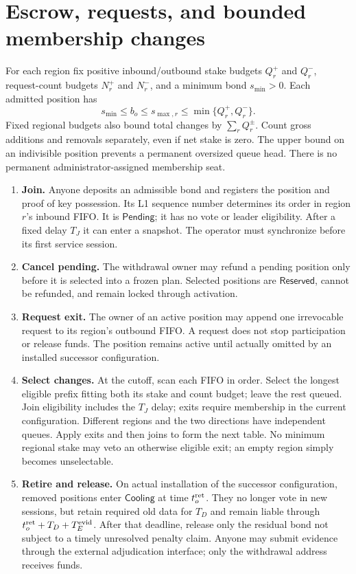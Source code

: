\documentclass[11pt,a4paper]{article}
\newcommand{\Tag}[1]{\ensuremath{\mathsf{#1}}}
\begin{document}
\section{Escrow, requests, and bounded membership changes}
\label{sec:stake}

For each region fix positive inbound/outbound stake budgets $Q_r^+$ and
$Q_r^-$, request-count budgets $N_r^+$ and $N_r^-$, and a minimum bond
$s_{\min}>0$. Each admitted position has
\[
s_{\min}\le b_o\le s_{\max,r}\le\min\{Q_r^+,Q_r^-\}.
\]
Fixed regional budgets also bound total changes by $\sum_r Q_r^\pm$.
Count gross additions and removals separately, even if net stake is zero.
The upper bound on an indivisible position prevents a permanent oversized
queue head. There is no permanent administrator-assigned membership seat.

\begin{enumerate}[label=\textbf{S\arabic*.},itemsep=4pt]
\item \textbf{Join.} Anyone deposits an admissible bond and registers the
position and proof of key possession. Its L1 sequence number determines
its order in region $r$'s inbound FIFO. It is \Tag{Pending}; it has no vote
or leader eligibility. After a fixed delay $T_J$ it can enter a snapshot.
The operator must synchronize before its first service session.
\item \textbf{Cancel pending.} The withdrawal owner may refund a pending
position only before it is selected into a frozen plan. Selected positions
are \Tag{Reserved}, cannot be refunded, and remain locked through activation.
\item \textbf{Request exit.} The owner of an active position may append one
irrevocable request to its region's outbound FIFO. A request does not stop
participation or release funds. The position remains active until actually
omitted by an installed successor configuration.
\item \textbf{Select changes.} At the cutoff, scan each FIFO in order.
Select the longest eligible prefix fitting both its stake and count budget;
leave the rest queued. Join eligibility includes the $T_J$ delay; exits
require membership in the current configuration. Different regions and
the two directions have independent queues. Apply exits and then joins to
form the next table. No minimum regional stake may veto an otherwise
eligible exit; an empty region simply becomes unselectable.
\item \textbf{Retire and release.} On actual installation of the successor
configuration, removed positions enter \Tag{Cooling} at time $t_o^{\rm ret}$.
They no longer vote in new sessions, but retain required old data for
$T_D$ and remain liable through $t_o^{\rm ret}+T_D+T_E^{\rm evid}$.
After that deadline, release only the residual bond not subject to a
timely unresolved penalty claim. Anyone may submit evidence through the
external adjudication interface; only the withdrawal address receives funds.
\end{enumerate}
\end{document}
